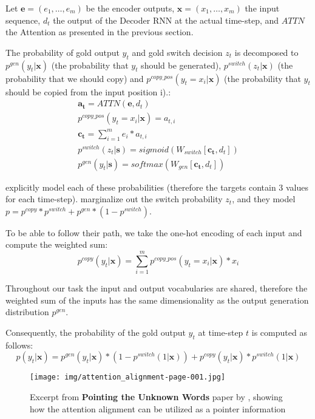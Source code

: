 Let $\boldsymbol{e} = (e_1, \dots, e_m)$ be the encoder outputs, $\boldsymbol{x} = (x_1, \dots, x_m)$ the input sequence, $d_t$ the output of the Decoder RNN at the actual time-step, and $ATTN$ the Attention as presented in the previous section.

The probability of gold output $y_t$ and gold switch decision $z_t$ is decomposed to $p^{gen}(y_t|\boldsymbol{x})$ (the probability that $y_t$ should be generated), $p^{switch}(z_t|\boldsymbol{x})$ (the probability that we should copy) and $p^{copy\_pos}(y_t = x_i |\boldsymbol{x})$ (the probability that $y_t$ should be copied from the input position i).:
\begin{gather}
    \boldsymbol{a_t} = ATTN(\boldsymbol{e}, d_t) \\
    p^{copy\_pos}(y_t = x_i | \boldsymbol{x}) = a_{t, i} \\
    \boldsymbol{c_t} = \sum_{i=1}^m{e_i * a_{t, i}} \\
    p^{switch}(z_t | \boldsymbol{s}) = sigmoid(W_{switch}[\boldsymbol{c_t}, d_t]) \\
    p^{gen}(y_t | \boldsymbol{s}) = softmax(W_{gen}[\boldsymbol{c_t}, d_t])
\end{gather}

\citep{gulcehre2016pointing} explicitly model each of these probabilities (therefore the targets contain 3 values for each time-step). \citep{yang2016referenceaware} marginalize out the switch probability $z_t$, and they model $p = p^{copy} * p^{switch} + p^{gen} * (1 - p^{switch})$.

To be able to follow their path, we take the one-hot encoding of each input and compute the weighted sum:
\begin{equation}
    p^{copy}(y_t|\boldsymbol{x}) = \sum_{i=1}^m{p^{copy\_pos}(y_t = x_i | \boldsymbol{x}) * x_i}
\end{equation}

Throughout our task the input and output vocabularies are shared, therefore the weighted sum of the inputs has the same dimensionality as the output generation distribution $p^{gen}$.

Consequently, the probability of the gold output $y_t$ at time-step $t$ is computed as follows:
\begin{equation}
    p(y_t|\boldsymbol{x}) = p^{gen}(y_t|\boldsymbol{x})*(1-p^{switch}(1|\boldsymbol{x})) + p^{copy}(y_t|\boldsymbol{x})*p^{switch}(1|\boldsymbol{x})
\end{equation}

\begin{figure}[hb]
    \centering
    \texttt{[image: img/attention\_alignment-page-001.jpg]}
    \caption{Excerpt from \textbf{Pointing the Unknown Words} paper by \citep{gulcehre2016pointing}, showing how the attention alignment can be utilized as a pointer information}
\end{figure}